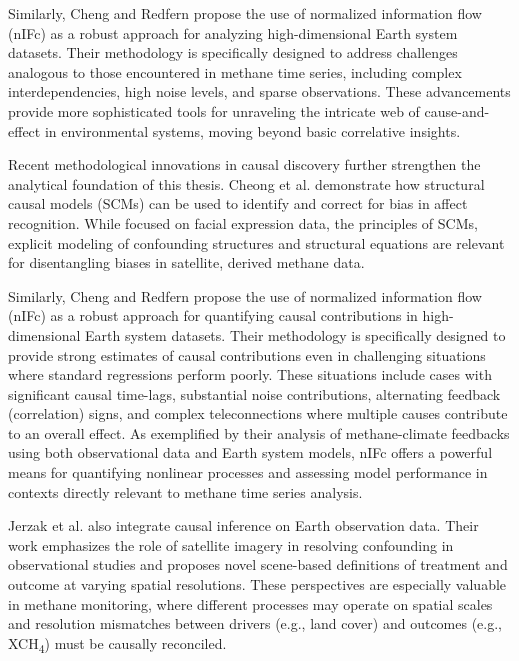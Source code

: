 Similarly, Cheng and Redfern \cite{cheng2021} propose the use of normalized information flow (nIFc) as a robust approach for analyzing high-dimensional Earth system datasets. Their methodology is specifically designed to address challenges analogous to those encountered in methane time series, including complex interdependencies, high noise levels, and sparse observations. These advancements provide more sophisticated tools for unraveling the intricate web of cause-and-effect in environmental systems, moving beyond basic correlative insights.

Recent methodological innovations in causal discovery further strengthen the analytical foundation of this thesis. Cheong et al. \cite{cheong2021causal} demonstrate how structural causal models (SCMs) can be used to identify and correct for bias in affect recognition. While focused on facial expression data, the principles of SCMs, explicit modeling of confounding structures and structural equations are relevant for disentangling biases in satellite, derived methane data.

Similarly, Cheng and Redfern \cite{cheng2021} propose the use of normalized information flow (nIFc) as a robust approach for quantifying causal contributions in high-dimensional Earth system datasets. Their methodology is specifically designed to provide strong estimates of causal contributions even in challenging situations where standard regressions perform poorly. These situations include cases with significant causal time-lags, substantial noise contributions, alternating feedback (correlation) signs, and complex teleconnections where multiple causes contribute to an overall effect. As exemplified by their analysis of methane-climate feedbacks using both observational data and Earth system models, nIFc offers a powerful means for quantifying nonlinear processes and assessing model performance in contexts directly relevant to methane time series analysis.

Jerzak et al. \cite{jerzak2023} also integrate causal inference on Earth observation data. Their work emphasizes the role of satellite imagery in resolving confounding in observational studies and proposes novel scene-based definitions of treatment and outcome at varying spatial resolutions. These perspectives are especially valuable in methane monitoring, where different processes may operate on spatial scales and resolution mismatches between drivers (e.g., land cover) and outcomes (e.g., XCH\textsubscript{4}) must be causally reconciled.

